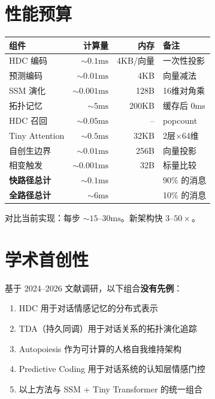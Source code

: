 \documentclass[11pt,a4paper]{article}
\begin{document}
\section{性能预算}

\begin{table}[h]
\centering
\begin{tabular}{lrrl}
\toprule
\textbf{组件} & \textbf{计算量} & \textbf{内存} & \textbf{备注} \\
\midrule
HDC 编码 & $\sim 0.1\text{ms}$ & 4KB/向量 & 一次性投影 \\
预测编码 & $\sim 0.01\text{ms}$ & 4KB & 向量减法 \\
SSM 演化 & $\sim 0.001\text{ms}$ & 128B & 16维对角乘 \\
拓扑记忆 & $\sim 5\text{ms}$ & 200KB & 缓存后 0ms \\
HDC 召回 & $\sim 0.05\text{ms}$ & -- & popcount \\
Tiny Attention & $\sim 0.5\text{ms}$ & 32KB & 2层$\times$64维 \\
自创生边界 & $\sim 0.01\text{ms}$ & 256B & 向量投影 \\
相变触发 & $\sim 0.001\text{ms}$ & 32B & 标量比较 \\
\midrule
\textbf{快路径总计} & $\sim 0.1\text{ms}$ & & 90\% 的消息 \\
\textbf{全路径总计} & $\sim 6\text{ms}$ & & 10\% 的消息 \\
\bottomrule
\end{tabular}
\end{table}

对比当前实现：每步 $\sim 15\text{--}30\text{ms}$。新架构快 $3\text{--}50\times$。

\section{学术首创性}

基于 2024--2026 文献调研，以下组合\textbf{没有先例}：

\begin{enumerate}[nosep]
  \item HDC 用于对话情感记忆的分布式表示
  \item TDA（持久同调）用于对话关系的拓扑演化追踪
  \item Autopoiesis 作为可计算的人格自我维持架构
  \item Predictive Coding 用于对话系统的认知层情感门控
  \item 以上方法与 SSM + Tiny Transformer 的统一组合
\end{enumerate}
\end{document}

